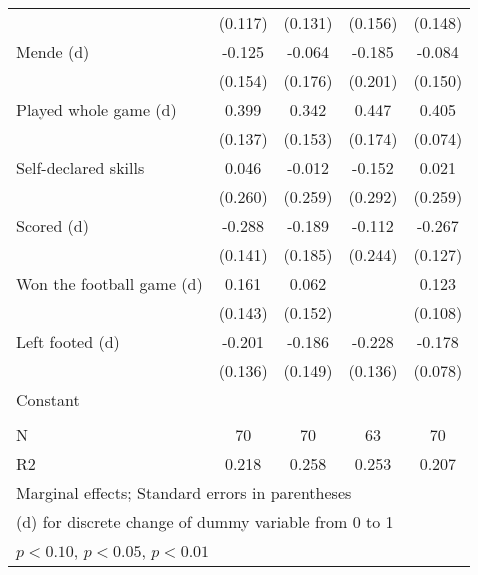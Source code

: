 {\begin{tabular}{l*{4}{c}}
                    &     (0.117)         &     (0.131)         &     (0.156)         &     (0.148)         \\
[1em]
Mende (d)           &      -0.125         &      -0.064         &      -0.185         &      -0.084         \\
                    &     (0.154)         &     (0.176)         &     (0.201)         &     (0.150)         \\
[1em]
Played whole game (d)&       0.399\sym{***}&       0.342\sym{**} &       0.447\sym{**} &       0.405\sym{***}\\
                    &     (0.137)         &     (0.153)         &     (0.174)         &     (0.074)         \\
[1em]
Self-declared skills&       0.046         &      -0.012         &      -0.152         &       0.021         \\
                    &     (0.260)         &     (0.259)         &     (0.292)         &     (0.259)         \\
[1em]
Scored (d)          &      -0.288\sym{**} &      -0.189         &      -0.112         &      -0.267\sym{**} \\
                    &     (0.141)         &     (0.185)         &     (0.244)         &     (0.127)         \\
[1em]
Won the football game (d)&       0.161         &       0.062         &                     &       0.123         \\
                    &     (0.143)         &     (0.152)         &                     &     (0.108)         \\
[1em]
Left footed (d)     &      -0.201         &      -0.186         &      -0.228\sym{*}  &      -0.178\sym{**} \\
                    &     (0.136)         &     (0.149)         &     (0.136)         &     (0.078)         \\
[1em]
Constant            &                     &                     &                     &                     \\
                    &                     &                     &                     &                     \\
\hline
N                   &          70         &          70         &          63         &          70         \\
R2                  &       0.218         &       0.258         &       0.253         &       0.207         \\
\hline\hline
\multicolumn{5}{l}{\footnotesize Marginal effects; Standard errors in parentheses}\\
\multicolumn{5}{l}{\footnotesize  (d) for discrete change of dummy variable from 0 to 1}\\
\multicolumn{5}{l}{\footnotesize \sym{*} \(p<0.10\), \sym{**} \(p<0.05\), \sym{***} \(p<0.01\)}\\
\end{tabular}
}
